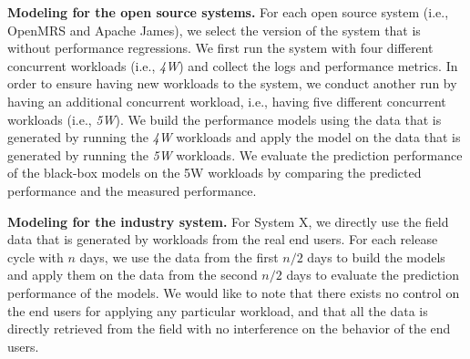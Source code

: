 \noindent\textbf{Modeling for the open source systems. }
For each open source system (i.e., OpenMRS and Apache James), we select the version of the system that is without performance regressions. We first run the system with four different concurrent workloads (i.e., \emph{4W}) and collect the logs and performance metrics. In order to ensure having new workloads to the system, we conduct another run by having an additional concurrent workload, i.e., having five different concurrent workloads (i.e., \emph{5W}). We build the performance models using the data that is generated by running the \emph{4W} workloads and apply the model on the data that is generated by running the \emph{5W} workloads. 
We evaluate the prediction performance of the black-box models on the 5W workloads by comparing the predicted performance and the measured performance.


\noindent\textbf{Modeling for the industry system. }
For System X, we directly use the field data that is generated by workloads from the real end users. For each release cycle with $n$ days, we use the data from the first $n/2$ days to build the models and apply them on the data from the second $n/2$ days to evaluate the prediction performance of the models. We would like to note that there exists no control on the end users for applying any particular workload, and that all the data is directly retrieved from the field with no interference on the behavior of the end users. 

